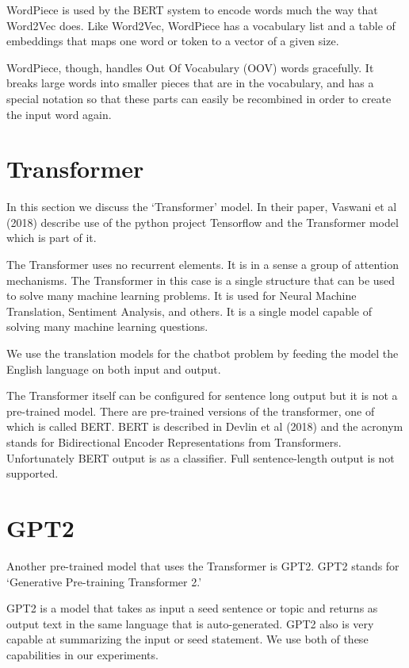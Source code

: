 WordPiece is used by the BERT system to encode words much the way that Word2Vec does.
Like Word2Vec, WordPiece  has a vocabulary list and a table of embeddings that maps one
word or token to a vector of a given size.

WordPiece, though, handles Out Of Vocabulary (OOV) words gracefully. It breaks large words
into smaller pieces that are in the vocabulary, and has a special notation so that
these parts can easily be recombined in order to create the input word again.


\section{Transformer}

In this section we discuss the `Transformer' model. In their paper, Vaswani et al (2018)\cite{tensor2tensor} describe use of the python project Tensorflow and the Transformer model which is part of it.

The Transformer uses no recurrent elements. It is in a sense a group of attention mechanisms. The Transformer in this case is a single structure that can be used to solve many machine learning problems. It is used for Neural Machine Translation, Sentiment Analysis, and others. It is a single model capable of solving many machine learning questions.

We use the translation models for the chatbot problem by feeding the model the English language on both input and output. 

The Transformer itself can be configured for sentence long output but it is not a pre-trained model. There are pre-trained versions of the transformer, one of which is called BERT. BERT is described in Devlin et al (2018)\cite{DBLP:journals/corr/abs-1810-04805} and the acronym stands for Bidirectional Encoder Representations from Transformers. Unfortunately BERT output is as a 
classifier. Full sentence-length output is not supported.

\section{GPT2}

Another pre-trained model that uses the Transformer is GPT2. GPT2 stands for `Generative Pre-training Transformer 2.'

GPT2 is a model that takes as input a seed sentence or topic and returns as output text in the same language that is auto-generated. GPT2 also is very capable at summarizing the input or seed statement. We use both of these capabilities in our experiments.

